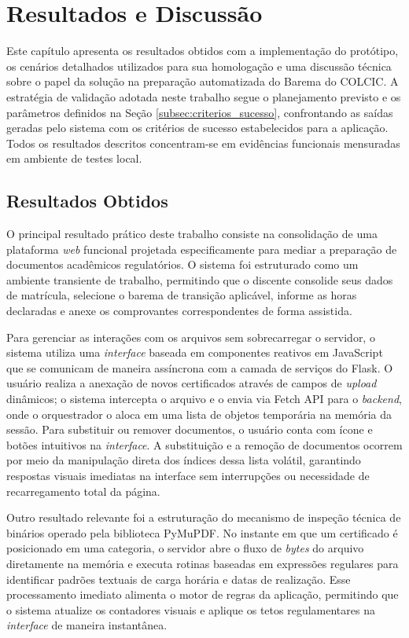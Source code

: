 \chapter{Resultados e Discussão}
\label{cap:resultados}

Este capítulo apresenta os resultados obtidos com a implementação do protótipo, os cenários detalhados utilizados para sua homologação e uma discussão técnica sobre o papel da solução na preparação automatizada do Barema do COLCIC. A estratégia de validação adotada neste trabalho segue o planejamento previsto e os parâmetros definidos na Seção \ref{subsec:criterios_sucesso}, confrontando as saídas geradas pelo sistema com os critérios de sucesso estabelecidos para a aplicação. Todos os resultados descritos concentram-se em evidências funcionais mensuradas em ambiente de testes local.

\section{Resultados Obtidos}

O principal resultado prático deste trabalho consiste na consolidação de uma plataforma \textit{web} funcional projetada especificamente para mediar a preparação de documentos acadêmicos regulatórios. O sistema foi estruturado como um ambiente transiente de trabalho, permitindo que o discente consolide seus dados de matrícula, selecione o barema de transição aplicável, informe as horas declaradas e anexe os comprovantes correspondentes de forma assistida.

Para gerenciar as interações com os arquivos sem sobrecarregar o servidor, o sistema utiliza uma \textit{interface} baseada em componentes reativos em JavaScript que se comunicam de maneira assíncrona com a camada de serviços do Flask. O usuário realiza a anexação de novos certificados através de campos de \textit{upload} dinâmicos; o sistema intercepta o arquivo e o envia via Fetch API para o \textit{backend}, onde o orquestrador o aloca em uma lista de objetos temporária na memória da sessão. Para substituir ou remover documentos, o usuário conta com ícone e botões intuitivos na \textit{interface}. A substituição e a remoção de documentos ocorrem por meio da manipulação direta dos índices dessa lista volátil, garantindo respostas visuais imediatas na interface sem interrupções ou necessidade de recarregamento total da página. 


Outro resultado relevante foi a estruturação do mecanismo de inspeção técnica de binários operado pela biblioteca PyMuPDF. No instante em que um certificado é posicionado em uma categoria, o servidor abre o fluxo de \textit{bytes} do arquivo diretamente na memória e executa rotinas baseadas em expressões regulares para identificar padrões textuais de carga horária e datas de realização. Esse processamento imediato alimenta o motor de regras da aplicação, permitindo que o sistema atualize os contadores visuais e aplique os tetos regulamentares na \textit{interface} de maneira instantânea.

